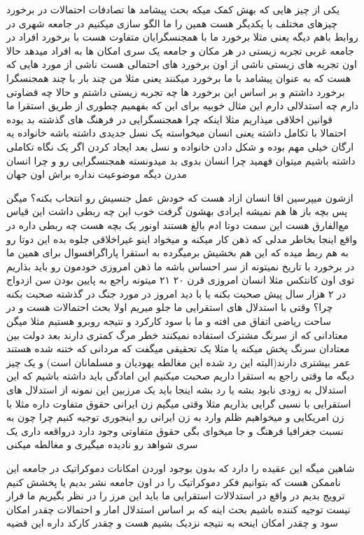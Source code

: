 \documentclass{article}
\begin{document}
		 یکی از چیز هایی که بهش کمک میکه بحث پیشامد ها تصادفات احتمالات در برخورد چیزهای مختلف با یکدیگر هست همین را
		ما الگو سازی میکنیم در جامعه شهری در روابط باهم دیگه یعنی مثلا برخورد ما با همجنسگرایان متفاوت هست با برخورد افراد در جامعه غربی
		تجربه زیستی در هر مکان و جامعه یک سری امکان ها به افراد میدهد حالا اون تجربه های زیستی ناشی از اون برخورد های احتمالی هست ناشی
		از مورد هایی که هست که به عنوان پیشامد با ما برخورد میکنند یعنی مثلا من چند بار با چند همجنسگرا برخورد داشتم و بر اساس این 
		برخورد ها چه تجربه زیستی داشتم و حالا چه قضاوتی دارم چه استدلالی دارم این مثال خوبیه برای این که بفهمیم چطوری از طریق استقرا ما 
		قوانین اخلاقی میذاریم مثلا اینکه چرا همجنسگرایی در فرهنگ های گذشته بد بوده احتمالا با تکامل داشته یعنی انسان میخواسته یک نسل جدیدی
		داشته باشه خانواده یه ارگان خیلی مهم بوده و شکل دادن خانواده و نسل بعد ایجاد کردن اگر یک نگاه تکاملی داشته باشیم میتوان فهمید 
		چرا انسان بدوی بد میدونسته همجنسگرایی رو و چرا انسان مدرن دیگه موضوعیت نداره براش اون جهان
		
		 ازشون میپرسین اقا انسان ازاد هست که خودش عمل جنسیش رو انتخاب بکنه؟ میگن پس بچه باز
		ها هم نمیشه ایرادی بهشون گرفت خوب این چه ربطی داشت این قیاس مع‌الفارق هست این سمت دوتا ادم بالغ هستند اونور یک بچه هست چه ربطی داره
		در واقع اینجا بخاطر مدلی که ذهن کار میکنه و میخواد اینو غیراخلاقی جلوه بده این دوتا رو به هم ربط میده که این هم بخشیش برمیگرده 
		به استقرا 
		پاراگراف{سوال} برای همین ما در برخورد با تاریخ نمیتونه از سر احساس باشه ما ذهن امروزی خودمون رو باید بذاریم توی اون کانتکس مثلا
		انسان امروزی قرن ۲۰ ۲۱ میتونه راجع به پایین بودن سن ازدواج در ۲ هزار سال پیش صحبت بکنه یا با دید امروز در مورد جنگ در گذشته صحبت
		بکنه چرا؟ وقتی با استدلال های استقرایی ما جلو میریم اولا بحث احتمالات هست و در ساحت ریاضی اتفاق می افته و ما با سود کارکرد و نتیجه
		روبرو هستیم مثلا میگن معتادانی که از سرنگ مشترک استفاده نمیکنند خطر مرگ کمتری دارند بعد دولت بین معتادان سرنگ پخش میکنه یا مثلا یک
		تحقیقی میگفت که مردانی که ختنه شده هستند عمر بیشتری دارند(البته این رد شده این مغالطه یهودیان و مسلمانان است) و یک چیز دیگه ما
		وقتی راجع به استقرا داریم صحبت میکنیم این امادگی باید داشته باشیم که این استدلال به زودی نابود بشه یا رد بشه اینجا باید یک مرزبین
		این نمونه از استدلال های استقرایی با نسبی گرایی بذاریم مثلا وقتی میگیم زن ایرانی حقوق متفاوت داره مثلا با زن امریکایی و میخواهیم 
		ظلم وارد به زن ایرانی رو اینجوری توجیه کنیم چرا چون به نسبت جغرافیا فرهنگ و جا میخوای بگی حقوق متفاوتی وجود دارد درواقعه داری
		یک سری شواهد رو نادیده میگیری  و مغالطه میکنی
		
		 شاهین میگه این عقیده را دارد که بدون بوجود اوردن امکانات دموکراتیک در جامعه این ناممکن هست که بتوانیم
		فکر دموکراتیک را در اون جامعه نشر بدیم یا پخشش کنیم ترویج بدیم در واقع در استدلالات استقرایی ما باید این مرز را در نظر بگیریم ما 
		قرار نیست توجیه کننده باشیم بحث اینه که بر اساس استدلال امار و احتمالات چقدر امکان سود و چقدر امکان اینحه به نتیجه نزدیک بشیم هست
		و چقدر کارکد داره این قضیه
	
\end{document}

